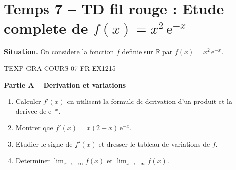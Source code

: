 

\section*{Temps 7 -- TD fil rouge : Etude complete de $f(x) = x^2\,\mathrm{e}^{-x}$}

\textbf{Situation.} On considere la fonction $f$ definie sur $\mathbb{R}$ par $f(x) = x^2\,\mathrm{e}^{-x}$.

\bigskip


\begin{exercice}{TEXP-GRA-COURS-07-FR-EX1}{2}{15}

\textbf{Partie A -- Derivation et variations}

\begin{enumerate}
  \item Calculer $f'(x)$ en utilisant la formule de derivation d'un produit et la derivee de $\mathrm{e}^{-x}$.
  \item Montrer que $f'(x) = x(2-x)\,\mathrm{e}^{-x}$.
  \item Etudier le signe de $f'(x)$ et dresser le tableau de variations de $f$.
  \item Determiner $\lim_{x \to +\infty} f(x)$ et $\lim_{x \to -\infty} f(x)$.
\end{enumerate}

\end{exercice}

